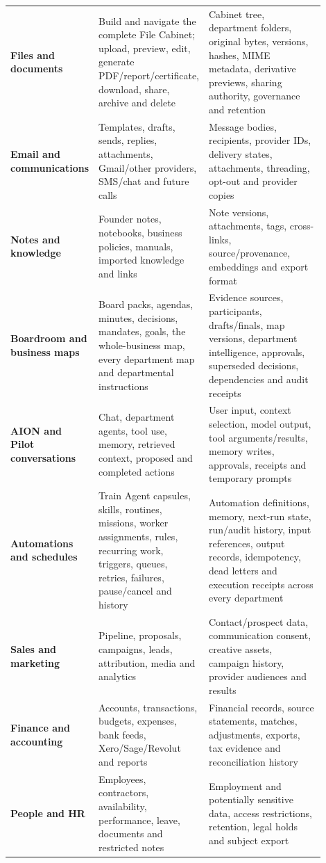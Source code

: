 \documentclass[11pt]{article}
\begin{document}
\begin{longtable}{>{\raggedright\arraybackslash\bfseries}p{0.19\linewidth} p{0.31\linewidth} p{0.40\linewidth}}
Files and documents & Build and navigate the complete File Cabinet; upload, preview, edit, generate PDF/report/certificate, download, share, archive and delete & Cabinet tree, department folders, original bytes, versions, hashes, MIME metadata, derivative previews, sharing authority, governance and retention \\
Email and communications & Templates, drafts, sends, replies, attachments, Gmail/other providers, SMS/chat and future calls & Message bodies, recipients, provider IDs, delivery states, attachments, threading, opt-out and provider copies \\
Notes and knowledge & Founder notes, notebooks, business policies, manuals, imported knowledge and links & Note versions, attachments, tags, cross-links, source/provenance, embeddings and export format \\
Boardroom and business maps & Board packs, agendas, minutes, decisions, mandates, goals, the whole-business map, every department map and departmental instructions & Evidence sources, participants, drafts/finals, map versions, department intelligence, approvals, superseded decisions, dependencies and audit receipts \\
AION and Pilot conversations & Chat, department agents, tool use, memory, retrieved context, proposed and completed actions & User input, context selection, model output, tool arguments/results, memory writes, approvals, receipts and temporary prompts \\
Automations and schedules & Train Agent capsules, skills, routines, missions, worker assignments, rules, recurring work, triggers, queues, retries, failures, pause/cancel and history & Automation definitions, memory, next-run state, run/audit history, input references, output records, idempotency, dead letters and execution receipts across every department \\
Sales and marketing & Pipeline, proposals, campaigns, leads, attribution, media and analytics & Contact/prospect data, communication consent, creative assets, campaign history, provider audiences and results \\
Finance and accounting & Accounts, transactions, budgets, expenses, bank feeds, Xero/Sage/Revolut and reports & Financial records, source statements, matches, adjustments, exports, tax evidence and reconciliation history \\
People and HR & Employees, contractors, availability, performance, leave, documents and restricted notes & Employment and potentially sensitive data, access restrictions, retention, legal holds and subject export \\

\end{longtable}
\end{document}
